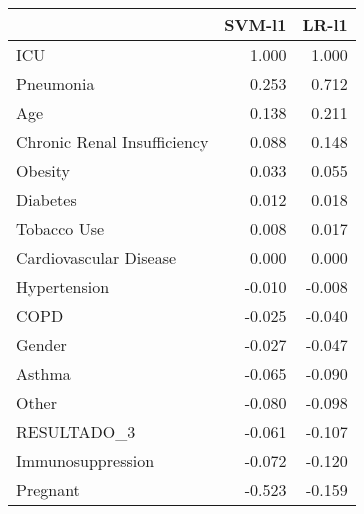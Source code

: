 \begin{tabular}{lrr}
\toprule
{} &  SVM-l1 &  LR-l1 \\
\midrule
ICU                         &   1.000 &  1.000 \\
Pneumonia                   &   0.253 &  0.712 \\
Age                         &   0.138 &  0.211 \\
Chronic Renal Insufficiency &   0.088 &  0.148 \\
Obesity                     &   0.033 &  0.055 \\
Diabetes                    &   0.012 &  0.018 \\
Tobacco Use                 &   0.008 &  0.017 \\
Cardiovascular Disease      &   0.000 &  0.000 \\
Hypertension                &  -0.010 & -0.008 \\
COPD                        &  -0.025 & -0.040 \\
Gender                      &  -0.027 & -0.047 \\
Asthma                      &  -0.065 & -0.090 \\
Other                       &  -0.080 & -0.098 \\
RESULTADO\_3                 &  -0.061 & -0.107 \\
Immunosuppression           &  -0.072 & -0.120 \\
Pregnant                    &  -0.523 & -0.159 \\
\bottomrule
\end{tabular}

